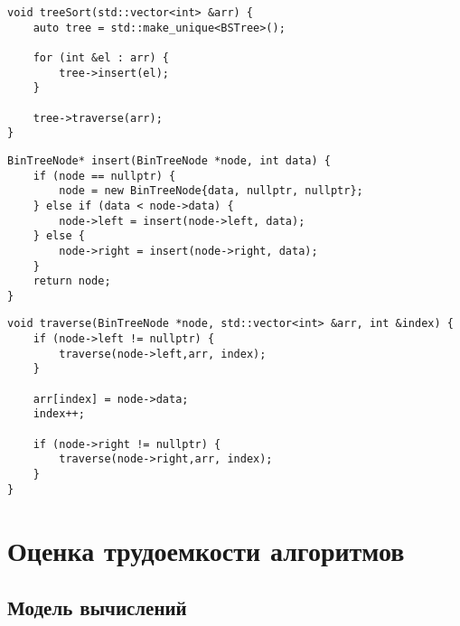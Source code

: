 \begin{lstlisting}[label=lst:treeSort,caption=Функция сортировки двоичным деревом]
void treeSort(std::vector<int> &arr) {
	auto tree = std::make_unique<BSTree>();
	
	for (int &el : arr) {
		tree->insert(el);
	}
	
	tree->traverse(arr);
}	
\end{lstlisting}
\clearpage
\begin{lstlisting}[label=lst:insert,caption=Функция вставки в дерево]
BinTreeNode* insert(BinTreeNode *node, int data) {
	if (node == nullptr) {
		node = new BinTreeNode{data, nullptr, nullptr};
	} else if (data < node->data) {
		node->left = insert(node->left, data);
	} else {
		node->right = insert(node->right, data);
	}
	return node;
}	
\end{lstlisting}

\begin{lstlisting}[label=lst:trav,caption=Функция обхода дерева]
void traverse(BinTreeNode *node, std::vector<int> &arr, int &index) {
	if (node->left != nullptr) {
		traverse(node->left,arr, index);
	}
	
	arr[index] = node->data;
	index++;
	
	if (node->right != nullptr) {
		traverse(node->right,arr, index);
	}
}	
\end{lstlisting}
\clearpage

\section{Оценка трудоемкости алгоритмов}

\subsection{Модель вычислений}


